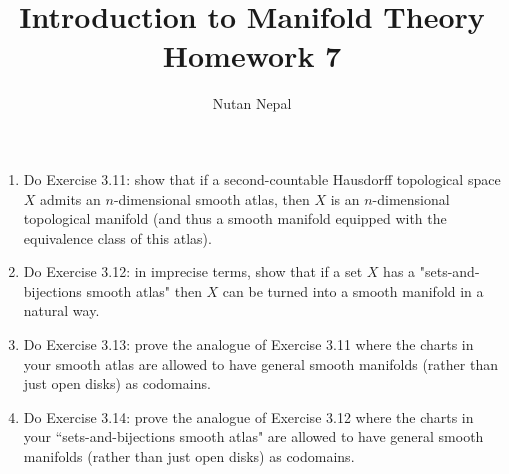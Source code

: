 \documentclass[12pt]{article}
\title{\textbf{Introduction to Manifold Theory} \\
\large Homework 7
}
\author{Nutan Nepal}
\begin{document}
\maketitle
\makebox[\linewidth]{\rule{200mm}{1pt}}
\vspace{1mm}

\begin{enumerate}

\item Do Exercise 3.11: show that if a second-countable
    Hausdorff topological space $X$ admits an
    $n$-dimensional smooth atlas, then $X$ is an
    $n$-dimensional topological manifold
    (and thus a smooth manifold equipped with the
    equivalence class of this atlas).

\begin{mybox}

\end{mybox}


\item Do Exercise 3.12: in imprecise terms,
    show that if a set $X$ has a "sets-and-bijections
    smooth atlas" then $X$ can be turned into a smooth
    manifold in a natural way.
 
\begin{mybox}

\end{mybox}
 
 
\item Do Exercise 3.13: prove the analogue of Exercise
    3.11 where the charts in your smooth atlas are allowed
    to have general smooth manifolds (rather than just
    open disks) as codomains.

\begin{mybox}

\end{mybox}

\item Do Exercise 3.14: prove the analogue of Exercise
    3.12 where the charts in your ``sets-and-bijections
    smooth atlas" are allowed to have general smooth
    manifolds (rather than just open disks) as codomains.

\begin{mybox}

\end{mybox}

\end{enumerate}
\end{document}
